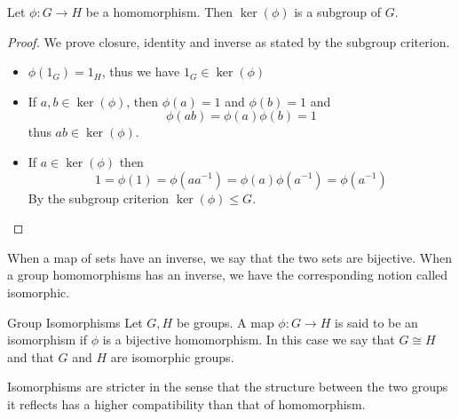 \documentclass[a4paper]{article}
\begin{document}
\begin{prp}{}{} Let $\phi:G\to H$ be a homomorphism. Then $\ker(\phi)$ is a subgroup of $G$. \tcbline
\begin{proof}
We prove closure, identity and inverse as stated by the subgroup criterion. 
\begin{itemize}
\item $\phi(1_G)=1_H$, thus we have $1_G\in\ker(\phi)$
\item If $a,b\in\ker(\phi)$, then $\phi(a)=1$ and $\phi(b)=1$ and $$\phi(ab)=\phi(a)\phi(b)=1$$ thus $ab\in\ker(\phi)$. 
\item If $a\in\ker(\phi)$ then $$1=\phi(1)=\phi(aa^{-1})=\phi(a)\phi(a^{-1})=\phi(a^{-1})$$ By the subgroup criterion $\ker(\phi)\leq G$. 
\end{itemize}
\end{proof}
\end{prp}

When a map of sets have an inverse, we say that the two sets are bijective. When a group homomorphisms has an inverse, we have the corresponding notion called isomorphic. 

\begin{defn}{Group Isomorphisms}{} Let $G,H$ be groups. A map $\phi:G\to H$ is said to be an isomorphism if $\phi$ is a bijective homomorphism. In this case we say that $G\cong H$ and that $G$ and $H$ are isomorphic groups. 
\end{defn}

Isomorphisms are stricter in the sense that the structure between the two groups it reflects has a higher compatibility than that of homomorphism. 
\end{document}
